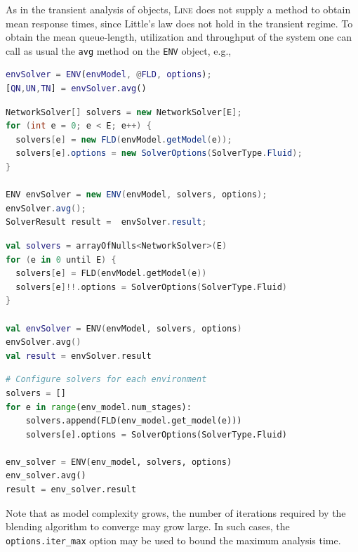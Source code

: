  As in the transient analysis of  objects, \textsc{Line} does not supply a method to obtain mean response times, since Little's law does not hold in the transient regime. To obtain the mean queue-length, utilization and throughput of the system one can call as usual the \texttt{avg} method on the \texttt{ENV} object, e.g.,
 \begin{MATLAB}
\begin{lstlisting}[language = matlab]
envSolver = ENV(envModel, @FLD, options);
[QN,UN,TN] = envSolver.avg()
\end{lstlisting}
\end{MATLAB}
\begin{JAVA}
\begin{lstlisting}[language = java, basicstyle=\ttfamily\scriptsize]
NetworkSolver[] solvers = new NetworkSolver[E];
for (int e = 0; e < E; e++) {
  solvers[e] = new FLD(envModel.getModel(e));
  solvers[e].options = new SolverOptions(SolverType.Fluid);
}

ENV envSolver = new ENV(envModel, solvers, options);
envSolver.avg();
SolverResult result =  envSolver.result;
\end{lstlisting}
\end{JAVA}
\begin{KOTLIN}
\begin{lstlisting}[language = kotlin, basicstyle=\ttfamily\scriptsize]
val solvers = arrayOfNulls<NetworkSolver>(E)
for (e in 0 until E) {
  solvers[e] = FLD(envModel.getModel(e))
  solvers[e]!!.options = SolverOptions(SolverType.Fluid)
}

val envSolver = ENV(envModel, solvers, options)
envSolver.avg()
val result = envSolver.result
\end{lstlisting}
\end{KOTLIN}
\begin{PYTHON}
\begin{lstlisting}[language=python]
# Configure solvers for each environment
solvers = []
for e in range(env_model.num_stages):
    solvers.append(FLD(env_model.get_model(e)))
    solvers[e].options = SolverOptions(SolverType.Fluid)

env_solver = ENV(env_model, solvers, options)
env_solver.avg()
result = env_solver.result
\end{lstlisting}
\end{PYTHON}
Note that as model complexity grows, the number of iterations required by the blending algorithm to converge may grow large. In such cases, the \texttt{options.iter\_max} option may be used to bound the maximum analysis time.


